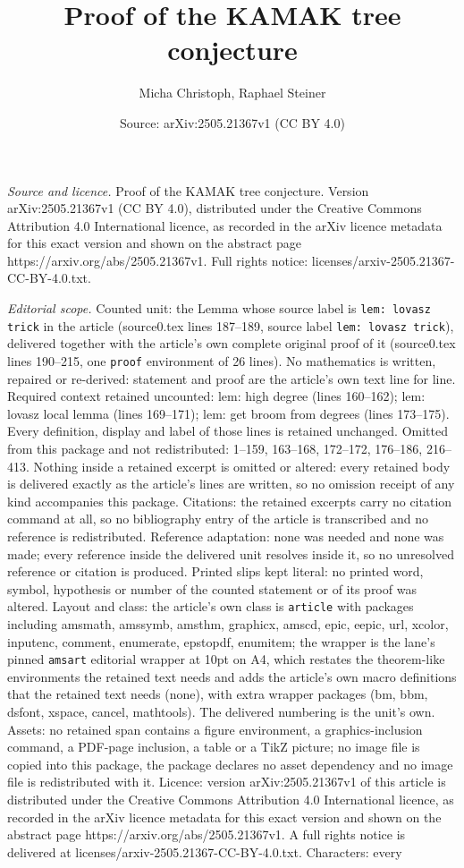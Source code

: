 \documentclass[10pt,a4paper]{amsart}
\title[Proof of the KAMAK tree conjecture]{Proof of the KAMAK tree conjecture}
\author{Micha Christoph, Raphael Steiner}
\date{Source: arXiv:2505.21367v1 (CC BY 4.0)}
\begin{document}
\maketitle

\noindent\emph{Source and licence.} Proof of the KAMAK tree conjecture. Version arXiv:2505.21367v1 (CC BY 4.0), distributed under the Creative Commons Attribution 4.0 International licence, as recorded in the arXiv licence metadata for this exact version and shown on the abstract page https://arxiv.org/abs/2505.21367v1. Full rights notice: licenses/arxiv-2505.21367-CC-BY-4.0.txt.\par\smallskip

\noindent\textit{Editorial scope.} Counted unit: the Lemma whose source label is \texttt{lem: lovasz trick} in the article (source0.tex lines 187--189, source label \texttt{lem: lovasz trick}), delivered together with the article's own complete original proof of it (source0.tex lines 190--215, one \texttt{proof} environment of 26 lines). No mathematics is written, repaired or re-derived: statement and proof are the article's own text line for line. Required context retained uncounted: lem: high degree (lines 160--162); lem: lovasz local lemma (lines 169--171); lem: get broom from degrees (lines 173--175). Every definition, display and label of those lines is retained unchanged. Omitted from this package and not redistributed: 1--159, 163--168, 172--172, 176--186, 216--413. Nothing inside a retained excerpt is omitted or altered: every retained body is delivered exactly as the article's lines are written, so no omission receipt of any kind accompanies this package. Citations: the retained excerpts carry no citation command at all, so no bibliography entry of the article is transcribed and no reference is redistributed. Reference adaptation: none was needed and none was made; every reference inside the delivered unit resolves inside it, so no unresolved reference or citation is produced. Printed slips kept literal: no printed word, symbol, hypothesis or number of the counted statement or of its proof was altered. Layout and class: the article's own class is \texttt{article} with packages including amsmath, amssymb, amsthm, graphicx, amscd, epic, eepic, url, xcolor, inputenc, comment, enumerate, epstopdf, enumitem; the wrapper is the lane's pinned \texttt{amsart} editorial wrapper at 10pt on A4, which restates the theorem-like environments the retained text needs and adds the article's own macro definitions that the retained text needs (none), with extra wrapper packages (bm, bbm, dsfont, xspace, cancel, mathtools). The delivered numbering is the unit's own. Assets: no retained span contains a figure environment, a graphics-inclusion command, a PDF-page inclusion, a table or a TikZ picture; no image file is copied into this package, the package declares no asset dependency and no image file is redistributed with it. Licence: version arXiv:2505.21367v1 of this article is distributed under the Creative Commons Attribution 4.0 International licence, as recorded in the arXiv licence metadata for this exact version and shown on the abstract page https://arxiv.org/abs/2505.21367v1. A full rights notice is delivered at licenses/arxiv-2505.21367-CC-BY-4.0.txt. Characters: every 
\end{document}
